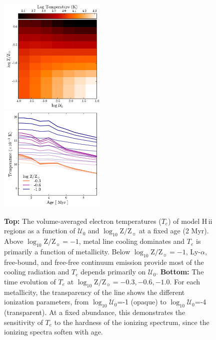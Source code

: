 \documentclass[twocolumn, tighten]{aastex61}
\newcommand{\logten}{\ensuremath{\log_{10}}}
\newcommand{\Te}{\ensuremath{T_{e}}}
\newcommand{\hii}{H\,{\sc ii}\xspace}
\newcommand{\logz}{\ensuremath{\logten \mathrm{Z}/\mathrm{Z}_{\sun}}}
\newcommand{\logZeq}[1]{\ensuremath{\logten \mathrm{Z}/\mathrm{Z}_{\sun} = #1}}
\newcommand{\U}{\ensuremath{\mathcal{U}_{0}}}
\newcommand{\logU}{\ensuremath{\logten \mathcal{U}_0}}
\begin{document}
\begin{figure}
  \begin{centering}
    \includegraphics[width=0.45\textwidth]{f6a.pdf}\\
    \includegraphics[width=0.45\textwidth]{f6b.pdf}
    \caption{\textbf{Top:} The volume-averaged electron temperatures (\Te{}) of model \hii regions as a function of \U{} and \logz{} at a fixed age (2 Myr). Above \logZeq{-1}, metal line cooling dominates and \Te{} is primarily a function of metallicity. Below \logZeq{-1}, Ly-$\alpha$, free-bound, and free-free continuum emission provide most of the cooling radiation and \Te{} depends primarily on \U{}. \textbf{Bottom:} The time evolution of \Te{} at \logZeq{-0.3, -0.6, -1.0}. For each metallicity, the transparency of the line shows the different ionization parameters, from \logU{}=-1 (opaque) to \logU{}=-4 (transparent). At a fixed abundance, this demonstrates the sensitivity of \Te{} to the hardness of the ionizing spectrum, since the ionizing spectra soften with age.} 
    \label{fig:temp}
  \end{centering}
\end{figure}
\end{document}
